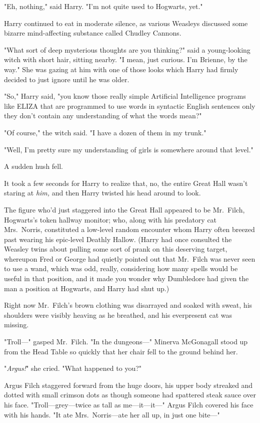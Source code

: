 "Eh, nothing," said Harry. "I'm not quite used to Hogwarts, yet."

Harry continued to eat in moderate silence, as various Weasleys discussed some 
bizarre mind-affecting substance called Chudley Cannons.

"What sort of deep mysterious thoughts are you thinking?" said a young-looking 
witch with short hair, sitting nearby. "I mean, just curious. I'm Brienne, by 
the way." She was gazing at him with one of those looks which Harry had firmly 
decided to just ignore until he was older.

"So," Harry said, "you know those really simple Artificial Intelligence 
programs like ELIZA that are programmed to use words in syntactic English 
sentences only they don't contain any understanding of what the words mean?"

"Of course," the witch said. "I have a dozen of them in my trunk."

"Well, I'm pretty sure my understanding of girls is somewhere around that 
level."

A sudden hush fell.

It took a few seconds for Harry to realize that, no, the entire Great Hall 
wasn't staring at \emph{him,} and then Harry twisted his head around to look.

The figure who'd just staggered into the Great Hall appeared to be Mr.~Filch, 
Hogwarts's token hallway monitor; who, along with his predatory cat 
Mrs.~Norris, constituted a low-level random encounter whom Harry often breezed 
past wearing his epic-level Deathly Hallow. (Harry had once consulted the 
Weasley twins about pulling some sort of prank on this deserving target, 
whereupon Fred or George had quietly pointed out that Mr.~Filch was never seen 
to use a wand, which was odd, really, considering how many spells would be 
useful in that position, and it made you wonder why Dumbledore had given the 
man a position at Hogwarts, and Harry had shut up.)

Right now Mr.~Filch's brown clothing was disarrayed and soaked with sweat, his 
shoulders were visibly heaving as he breathed, and his everpresent cat was 
missing.

"Troll---" gasped Mr.~Filch. "In the dungeons---"
\sbreak
Minerva McGonagall stood up from the Head Table so quickly that her chair fell 
to the ground behind her.

"\emph{Argus!}" she cried. "What happened to you?"

Argus Filch staggered forward from the huge doors, his upper body streaked and 
dotted with small crimson dots as though someone had spattered steak sauce over 
his face. "Troll---grey---twice as tall as me---it---it---" Argus Filch covered 
his face with his hands. "It ate Mrs.~Norris---ate her all up, in just one 
bite---"

